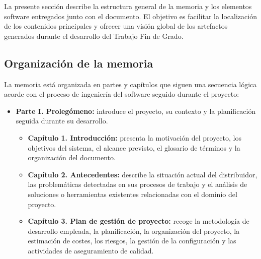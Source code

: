 La presente sección describe la estructura general de la memoria y los elementos software entregados junto con el documento. El objetivo es facilitar la localización de los contenidos principales y ofrecer una visión global de los artefactos generados durante el desarrollo del Trabajo Fin de Grado.

\subsection{Organización de la memoria}

La memoria está organizada en partes y capítulos que siguen una secuencia lógica acorde con el proceso de ingeniería del software seguido durante el proyecto:

\begin{itemize}
    \item \textbf{Parte I. Prolegómeno:} introduce el proyecto, su contexto y la planificación seguida durante su desarrollo.
          \begin{itemize}
              \item \textbf{Capítulo 1. Introducción:} presenta la motivación del proyecto, los objetivos del sistema, el alcance previsto, el glosario de términos y la organización del documento.
              \item \textbf{Capítulo 2. Antecedentes:} describe la situación actual del distribuidor, las problemáticas detectadas en sus procesos de trabajo y el análisis de soluciones o herramientas existentes relacionadas con el dominio del proyecto.
              \item \textbf{Capítulo 3. Plan de gestión de proyecto:} recoge la metodología de desarrollo empleada, la planificación, la organización del proyecto, la estimación de costes, los riesgos, la gestión de la configuración y las actividades de aseguramiento de calidad.
          \end{itemize}


\end{itemize}
